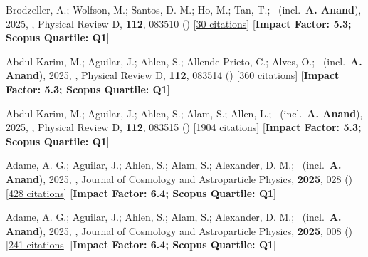 \item[{\color{numcolor}\scriptsize22}] Brodzeller, A.; Wolfson, M.; Santos, D. M.; Ho, M.; Tan, T.; \etal\ (incl.\ \textbf{A. Anand}), 2025, , Physical Review D, \textbf{112}, 083510 () [\href{https://ui.adsabs.harvard.edu/abs/2025PhRvD.112h3510B}{30 citations}] [\textbf{Impact Factor: 5.3; Scopus Quartile: Q1}]

\item[{\color{numcolor}\scriptsize21}] Abdul Karim, M.; Aguilar, J.; Ahlen, S.; Allende Prieto, C.; Alves, O.; \etal\ (incl.\ \textbf{A. Anand}), 2025, , Physical Review D, \textbf{112}, 083514 () [\href{https://ui.adsabs.harvard.edu/abs/2025PhRvD.112h3514A}{360 citations}] [\textbf{Impact Factor: 5.3; Scopus Quartile: Q1}]

\item[{\color{numcolor}\scriptsize20}] Abdul Karim, M.; Aguilar, J.; Ahlen, S.; Alam, S.; Allen, L.; \etal\ (incl.\ \textbf{A. Anand}), 2025, , Physical Review D, \textbf{112}, 083515 () [\href{https://ui.adsabs.harvard.edu/abs/2025PhRvD.112h3515A}{1904 citations}] [\textbf{Impact Factor: 5.3; Scopus Quartile: Q1}]

\item[{\color{numcolor}\scriptsize19}] Adame, A. G.; Aguilar, J.; Ahlen, S.; Alam, S.; Alexander, D. M.; \etal\ (incl.\ \textbf{A. Anand}), 2025, , Journal of Cosmology and Astroparticle Physics, \textbf{2025}, 028 () [\href{https://ui.adsabs.harvard.edu/abs/2025JCAP...07..028A}{428 citations}] [\textbf{Impact Factor: 6.4; Scopus Quartile: Q1}]

\item[{\color{numcolor}\scriptsize18}] Adame, A. G.; Aguilar, J.; Ahlen, S.; Alam, S.; Alexander, D. M.; \etal\ (incl.\ \textbf{A. Anand}), 2025, , Journal of Cosmology and Astroparticle Physics, \textbf{2025}, 008 () [\href{https://ui.adsabs.harvard.edu/abs/2025JCAP...09..008A}{241 citations}] [\textbf{Impact Factor: 6.4; Scopus Quartile: Q1}]

